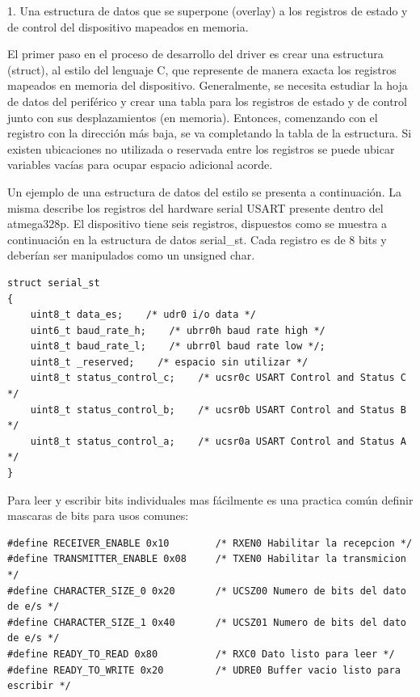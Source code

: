 \documentclass[12pt]{article}
\begin{document}
1. Una estructura de datos que se superpone (overlay) a los registros de estado
y de control del dispositivo mapeados en memoria.

El primer paso en el proceso de desarrollo del driver es crear una estructura
(struct), al estilo del lenguaje C, que represente de manera exacta los registros
mapeados en memoria del dispositivo. Generalmente, se necesita estudiar
la hoja de datos del periférico y crear una tabla para los registros
de estado y de control junto con sus desplazamientos (en memoria).
Entonces, comenzando con el registro con la dirección más baja, se 
va completando la tabla de la estructura. Si existen ubicaciones no 
utilizada o reservada entre los registros se puede ubicar variables
vacías para ocupar espacio adicional acorde.

Un ejemplo de una estructura de datos del estilo se presenta a continuación.
La misma describe los registros del hardware serial USART presente dentro
del atmega328p. El dispositivo tiene seis registros, dispuestos como se muestra
a continuación en la estructura de datos serial\_st. Cada registro es de 
8 bits y deberían ser manipulados como un unsigned char.

\begin{verbatim}
struct serial_st
{
    uint8_t data_es;	/* udr0 i/o data */
    uint6_t baud_rate_h;    /* ubrr0h baud rate high */
    uint8_t baud_rate_l;    /* ubrr0l baud rate low */;
    uint8_t _reserved;    /* espacio sin utilizar */
    uint8_t status_control_c;    /* ucsr0c USART Control and Status C */
    uint8_t status_control_b;    /* ucsr0b USART Control and Status B */
    uint8_t status_control_a;    /* ucsr0a USART Control and Status A */
}
\end{verbatim}


Para leer y escribir bits individuales mas fácilmente es una practica común
definir mascaras de bits para usos comunes:

\begin{verbatim}
#define RECEIVER_ENABLE 0x10        /* RXEN0 Habilitar la recepcion */
#define TRANSMITTER_ENABLE 0x08     /* TXEN0 Habilitar la transmicion */
#define CHARACTER_SIZE_0 0x20       /* UCSZ00 Numero de bits del dato de e/s */
#define CHARACTER_SIZE_1 0x40       /* UCSZ01 Numero de bits del dato de e/s */
#define READY_TO_READ 0x80          /* RXC0 Dato listo para leer */
#define READY_TO_WRITE 0x20         /* UDRE0 Buffer vacio listo para escribir */
\end{verbatim}
\end{document}
